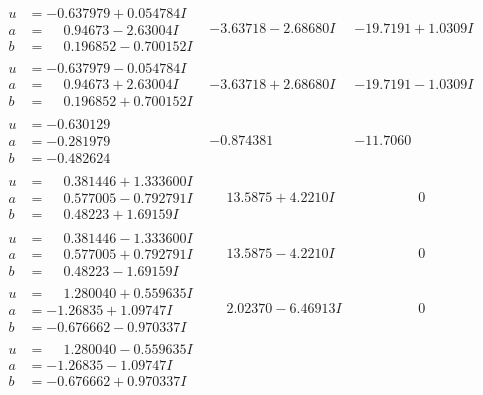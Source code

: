 \documentclass[1p]{elsarticle_modified}
\theoremstyle{definition}
\begin{document}
$$\begin{array}{c|c|c}
\begin{aligned}
u &= -0.637979 + 0.054784 I \\
a &= \phantom{-}0.94673 - 2.63004 I \\
b &= \phantom{-}0.196852 - 0.700152 I\end{aligned}
 & -3.63718 - 2.68680 I & -19.7191 + 1.0309 I \\ \hline\begin{aligned}
u &= -0.637979 - 0.054784 I \\
a &= \phantom{-}0.94673 + 2.63004 I \\
b &= \phantom{-}0.196852 + 0.700152 I\end{aligned}
 & -3.63718 + 2.68680 I & -19.7191 - 1.0309 I \\ \hline\begin{aligned}
u &= -0.630129\phantom{ +0.000000I} \\
a &= -0.281979\phantom{ +0.000000I} \\
b &= -0.482624\phantom{ +0.000000I}\end{aligned}
 & -0.874381\phantom{ +0.000000I} & -11.7060\phantom{ +0.000000I} \\ \hline\begin{aligned}
u &= \phantom{-}0.381446 + 1.333600 I \\
a &= \phantom{-}0.577005 - 0.792791 I \\
b &= \phantom{-}0.48223 + 1.69159 I\end{aligned}
 & \phantom{-}13.5875 + 4.2210 I & \phantom{-0.000000 } 0 \\ \hline\begin{aligned}
u &= \phantom{-}0.381446 - 1.333600 I \\
a &= \phantom{-}0.577005 + 0.792791 I \\
b &= \phantom{-}0.48223 - 1.69159 I\end{aligned}
 & \phantom{-}13.5875 - 4.2210 I & \phantom{-0.000000 } 0 \\ \hline\begin{aligned}
u &= \phantom{-}1.280040 + 0.559635 I \\
a &= -1.26835 + 1.09747 I \\
b &= -0.676662 - 0.970337 I\end{aligned}
 & \phantom{-}2.02370 - 6.46913 I & \phantom{-0.000000 } 0 \\ \hline\begin{aligned}
u &= \phantom{-}1.280040 - 0.559635 I \\
a &= -1.26835 - 1.09747 I \\
b &= -0.676662 + 0.970337 I\end{aligned}

\end{array}$$
\end{document}
